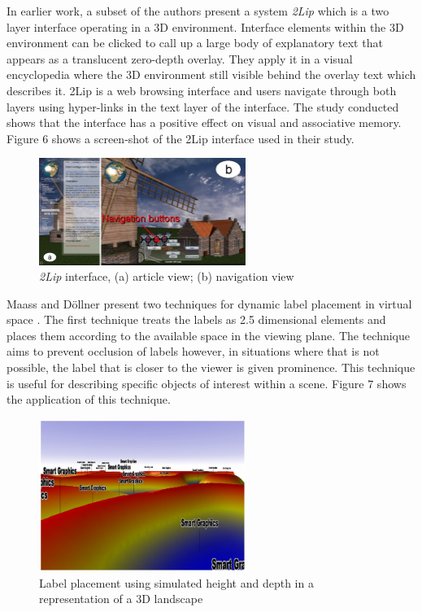 \documentclass{article}
\begin{document}
In earlier work, a subset of the authors \cite{Jankowski:2009:FGC:1559764.1559793} present a system \textit{2Lip} which is a two layer interface operating in a 3D environment. Interface elements within the 3D environment can be clicked to call up a large body of explanatory text that appears as a translucent zero-depth overlay. They apply it in a visual encyclopedia where the 3D environment still visible behind the overlay text which describes it. 2Lip is a web browsing interface and users navigate through both layers using hyper-links in the text layer of the interface. The study conducted shows that the interface has a positive effect on visual and associative memory. Figure 6 shows a screen-shot of the 2Lip interface used in their study.  
\begin{figure}[htbp]
		\hspace{0.2\textwidth}
        \includegraphics[width=0.6\textwidth]{Images/2lipv2.jpg}
    	\caption{\textit{2Lip} interface, (a) article view; (b) navigation view  \cite{Jankowski:2009:FGC:1559764.1559793}}
\end{figure}

Maass and Döllner present two techniques for dynamic label placement in virtual space \cite{Maass2006,Maass:2007:ELL:1294685.1294695}. The first technique treats the labels as 2.5 dimensional elements and places them according to the available space in the viewing plane. The technique aims to prevent occlusion of labels however, in situations where that is not possible, the label that is closer to the viewer is given prominence. This technique is useful for describing specific objects of interest within a scene. Figure 7 shows the application of this technique. 
\begin{figure}[htbp]
		\hspace{0.2\textwidth}
        \includegraphics[width=0.6\textwidth]{Images/labelplacement.jpg}
    	\caption{Label placement using simulated height and depth in a representation of a 3D landscape\cite{Maass2006}}
\end{figure}
\end{document}
